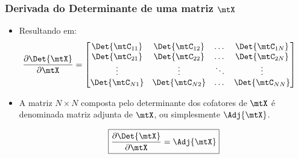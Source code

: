 \begin{frame}
	\frametitle{\normalsize Derivada do Determinante de uma matriz $\mtX$}
	\begin{itemize}
		\item Resultando em:
		{\tiny
		\begin{align*}
			\frac{\partial \Det{\mtX}}{\partial \mtX} &= \begin{bmatrix}
				\Det{\mtC_{11}} & \Det{\mtC_{12}} & \dots & \Det{\mtC_{1N}} \\
				\Det{\mtC_{21}} & \Det{\mtC_{22}} & \dots & \Det{\mtC_{2N}} \\
				\vdots & \vdots & \ddots & \vdots \\
				\Det{\mtC_{N1}} & \Det{\mtC_{N2}} & \dots & \Det{\mtC_{NN}} \\
			\end{bmatrix}
		\end{align*}}
		\item A matriz $N \times N$ composta pelo determinante dos cofatores de $\mtX$ é denominada matriz adjunta de $\mtX$, ou simplesmente $\Adj{\mtX}$.
		
		\[
			\boxed{\frac{\partial \Det{\mtX}}{\partial \mtX} = \Adj{\mtX}}
		\]
	\end{itemize}
\end{frame}
